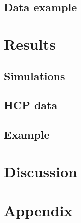 \subsection{Data example}


 \section{Results}

\subsection{Simulations}


\clearpage
\subsection{HCP data}


\clearpage
\subsection{Example}


%


 \section{Discussion}




\clearpage
\section*{Appendix}
\begin{appendix}






 \end{appendix}





 




